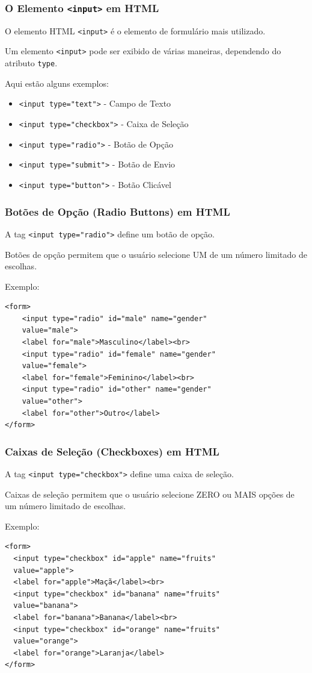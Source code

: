 \documentclass{beamer}
\begin{document}
\begin{frame}
  \frametitle{O Elemento \texttt{<input>} em HTML}

  O elemento HTML \texttt{<input>} é o elemento de formulário mais utilizado.

  Um elemento \texttt{<input>} pode ser exibido de várias maneiras, dependendo do atributo \texttt{type}.

  Aqui estão alguns exemplos:

  \begin{itemize}
    \item \texttt{<input type="text"}\texttt{>} - Campo de Texto
    \item \texttt{<input type="checkbox"}\texttt{>}  - Caixa de Seleção
    \item \texttt{<input type="radio"}\texttt{>}  - Botão de Opção
    \item \texttt{<input type="submit"}\texttt{>}  - Botão de Envio
    \item \texttt{<input type="button"}\texttt{>} - Botão Clicável
  \end{itemize}
\end{frame}

\begin{frame}[fragile]
  \frametitle{Botões de Opção (Radio Buttons) em HTML}

  A tag \texttt{<input type="radio"}\texttt{>} define um botão de opção.

  Botões de opção permitem que o usuário selecione UM de um número limitado de escolhas.

  Exemplo:

\begin{verbatim}
<form>
    <input type="radio" id="male" name="gender"
    value="male">
    <label for="male">Masculino</label><br>
    <input type="radio" id="female" name="gender" 
    value="female">
    <label for="female">Feminino</label><br>
    <input type="radio" id="other" name="gender" 
    value="other">
    <label for="other">Outro</label>
</form>
\end{verbatim}
\end{frame}


\begin{frame}[fragile]
  \frametitle{Caixas de Seleção (Checkboxes) em HTML}

  A tag \texttt{<input type="checkbox">} define uma caixa de seleção.

  Caixas de seleção permitem que o usuário selecione ZERO ou MAIS opções de um número limitado de escolhas.

  Exemplo:

\begin{verbatim}
<form>
  <input type="checkbox" id="apple" name="fruits" 
  value="apple">
  <label for="apple">Maçã</label><br>
  <input type="checkbox" id="banana" name="fruits" 
  value="banana">
  <label for="banana">Banana</label><br>
  <input type="checkbox" id="orange" name="fruits" 
  value="orange">
  <label for="orange">Laranja</label>
</form>
  \end{verbatim}
\end{frame}
\end{document}

